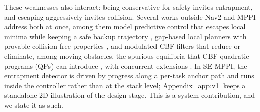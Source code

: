 \documentclass[journal]{IEEEtran}
\begin{document}
These weaknesses also interact: being conservative for safety invites
entrapment, and escaping aggressively invites collision. Several works
outside Nav2 and MPPI address both at once, among them model predictive
control that escapes local minima while keeping a safe backup trajectory
\cite{soloperto}, gap-based local planners with provable collision-free
properties \cite{potential_gap,safer_gap,dynamic_gap}, and modulated CBF
filters \cite{mcbf_qp} that reduce or eliminate, among moving obstacles,
the spurious equilibria that CBF quadratic programs (QPs) can introduce
\cite{reis_cbf_equilibria}, with concurrent extensions
\cite{xue_proactive,chen_milp_cbf}. In SE-MPPI, the entrapment detector is driven by progress along a
per-task anchor path and runs inside the controller rather than at the stack
level; Appendix~\ref{app:v1} keeps a standalone 2D illustration of the design
stage. This is a system contribution, and we state it as
such.
\end{document}
